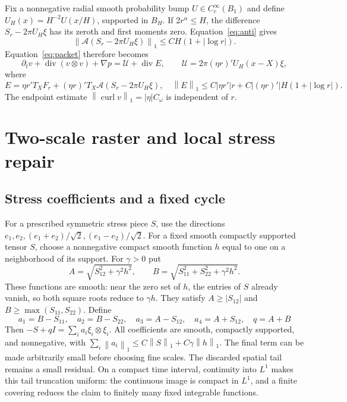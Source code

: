 \documentclass[11pt]{article}
\theoremstyle{remark}\newtheorem{remark}[theorem]{Remark}
\newcommand{\curl}{\operatorname{curl}}
\newcommand{\Div}{\operatorname{div}}
\newcommand{\norm}[2]{\left\|#1\right\|_{#2}}
\begin{document}
Fix a nonnegative radial smooth probability bump $U\in C_c^\infty(B_1)$ and define $U_H(x)=H^{-2}U(x/H)$, supported in $B_H$.
If $2r^\alpha\leq H$, the difference $S_r-2\pi U_H\xi$ has its zeroth and
first moments zero. Equation~\eqref{eq:anti} gives
\[
 \norm{\mathcal A(S_r-2\pi U_H\xi)}1\leq CH(1+|\log r|).
\]
Equation~\eqref{eq:packet} therefore becomes
\begin{equation}\label{eq:packet-source}
 \partial_tv+\Div(v\otimes v)+\nabla p=\mathcal U+\Div E,
 \qquad \mathcal U=2\pi(\eta r)'U_H(x-X)\xi,
\end{equation}
where
\begin{equation}\label{eq:E-bound}
 E=\eta r'T_XF_r+(\eta r)'T_X\mathcal A(S_r-2\pi U_H\xi),\quad
 \norm E1\leq C|\eta r'|r+C|(\eta r)'|H(1+|\log r|).
\end{equation}
The endpoint estimate $\norm{\curl v}1=|\eta|C_\omega$ is independent of $r$.

\section{Two-scale raster and local stress repair}\label{sec:repair-interface}

\subsection{Stress coefficients and a fixed cycle}
For a prescribed symmetric stress piece $S$, use the directions
$e_1,e_2,(e_1+e_2)/\sqrt2,(e_1-e_2)/\sqrt2$.
For a fixed smooth compactly supported tensor $S$, choose a nonnegative
compact smooth function $h$ equal to one on a neighborhood of its support.
For $\gamma>0$ put
\[
 A=\sqrt{S_{12}^2+\gamma^2h^2},\qquad
 B=\sqrt{S_{11}^2+S_{22}^2+\gamma^2h^2}.
\]
These functions are smooth: near the zero set of $h$, the entries of $S$
already vanish, so both square roots reduce to $\gamma h$.
They satisfy $A\geq|S_{12}|$ and $B\geq\max(S_{11},S_{22})$.
Define
\[
 a_1=B-S_{11},\quad a_2=B-S_{22},\quad
 a_3=A-S_{12},\quad a_4=A+S_{12},\quad q=A+B
\]
Then $-S+qI=\sum_i a_i\xi_i\otimes\xi_i$.
All coefficients are smooth, compactly supported, and nonnegative, with
$\sum_i\norm{a_i}1\leq C\norm S1+C\gamma\norm h1$.
The final term can be made arbitrarily small before choosing fine scales.
The discarded spatial tail remains a small residual. On a compact time
interval, continuity into $L^1$ makes this tail truncation uniform: the
continuous image is compact in $L^1$, and a finite covering reduces the claim
to finitely many fixed integrable functions.
\end{document}
